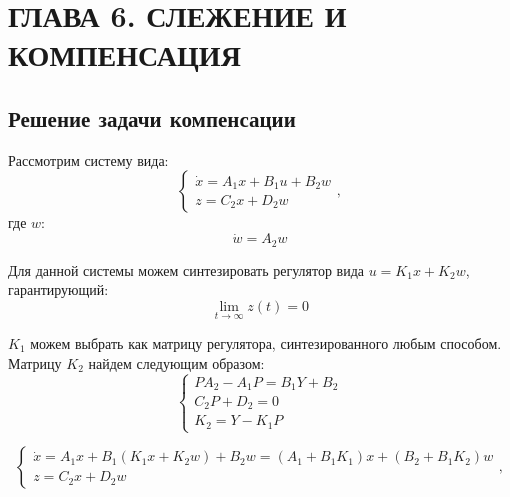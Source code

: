 \section{ГЛАВА 6. СЛЕЖЕНИЕ И КОМПЕНСАЦИЯ}

\subsection{Решение задачи компенсации}
Рассмотрим систему вида:
\[
    \begin{cases}
        \dot{x} = A_1x + B_1u + B_2w \\
        z = C_2x + D_2 w
    \end{cases},
\]
где $w$:
\[
    \dot{w} = A_2w
\]

Для данной системы можем синтезировать регулятор вида $u = K_1x + K_2w$, гарантирующий:
\begin{equation*}
    \lim_{t\to\infty} z(t) = 0
\end{equation*}

$K_1$ можем выбрать как матрицу регулятора, синтезированного любым способом. Матрицу $K_2$ найдем следующим образом:
\[
    \begin{cases}
        PA_2 - A_1P = B_1Y + B_2\\
        C_2P + D_2 = 0 \\
        K_2 = Y - K_1P
    \end{cases}
\]

\[
    \begin{cases}
        \dot{x} = A_1x + B_1 (K_1x + K_2w) + B_2w = (A_1 + B_1 K_1) x + (B_2 + B_1 K_2)w \\
        z = C_2x + D_2 w
    \end{cases},
\]

